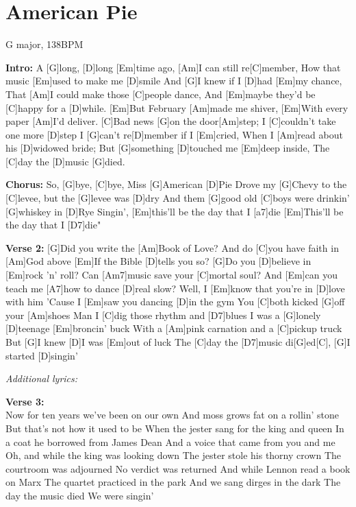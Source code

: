 \documentclass[../../songbookMain]{subfiles}
\begin{document}
\section{American Pie}
{\tiny
G major, 138BPM
}
\newpage
{}
\begin{guitar}
\textbf{Intro:}
A [G]long, [D]long [Em]time ago, 
[Am]I can still re[C]member,
How that music [Em]used to make me [D]smile
And [G]I knew if I [D]had [Em]my chance,
That [Am]I could make those [C]people dance,
And [Em]maybe they'd be [C]happy for a [D]while.
[Em]But February [Am]made me shiver,
[Em]With every paper [Am]I'd deliver.
[C]Bad news [G]on the door[Am]step;
I [C]couldn't take one more [D]step
I [G]can't re[D]member if I [Em]cried,
When I [Am]read about his [D]widowed bride;
But [G]something [D]touched me [Em]deep inside,
The [C]day the [D]music [G]died.

\textbf{Chorus:}
So, [G]bye, [C]bye, Miss [G]American [D]Pie
Drove my [G]Chevy to the [C]levee, but the [G]levee was [D]dry
And them [G]good old [C]boys were drinkin' [G]whiskey in [D]Rye
Singin', [Em]this'll be the day that I [a7]die
[Em]This'll be the day that I [D7]die"

  \textbf{Verse 2:}
[G]Did you write the [Am]Book of Love?
And do [C]you have faith in [Am]God above
[Em]If the Bible [D]tells you so?
[G]Do you [D]believe in [Em]rock 'n' roll?
Can [Am7]music save your [C]mortal soul?
And [Em]can you teach me [A7]how to dance [D]real slow?
Well, I [Em]know that you're in [D]love with him
'Cause I [Em]saw you dancing [D]in the gym
You [C]both kicked [G]off your [Am]shoes
Man I [C]dig those rhythm and [D7]blues
I was a [G]lonely [D]teenage [Em]broncin' buck
With a [Am]pink carnation and a [C]pickup truck
But [G]I knew [D]I was [Em]out of luck
The [C]day the [D7]music di[G]ed[C],
[G]I started [D]singin'
\vspace{-15mm}
\begin{center}
\textit{Additional lyrics:}
\end{center}\vspace{-15mm}
\begin{multicols}{3}\tiny\flushleft%
  \textbf{Verse 3:}\\
Now for ten years we've been on our own
And moss grows fat on a rollin' stone
But that's not how it used to be
When the jester sang for the king and queen
In a coat he borrowed from James Dean
And a voice that came from you and me
Oh, and while the king was looking down
The jester stole his thorny crown
The courtroom was adjourned
No verdict was returned
And while Lennon read a book on Marx
The quartet practiced in the park
And we sang dirges in the dark
The day the music died
We were singin'


\end{multicols}
\end{guitar}
\end{document}

